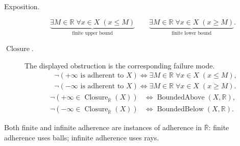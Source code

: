 \begin{remark*}
\begin{description}
  \item[Exposition.]
\[
\underbrace{\exists M\in\mathbb{R}\;\forall x\in X\;(x\le M)}_{\text{finite upper bound}}
\qquad
\underbrace{\exists M\in\mathbb{R}\;\forall x\in X\;(x\ge M)}_{\text{finite lower bound}}.
\]


  \item[\(\operatorname{Closure}.\)]
  The displayed obstruction is the corresponding failure mode.
  \[
\begin{aligned}
&\neg(+\infty\text{ is adherent to }X)
\Longleftrightarrow
\exists M\in\mathbb{R}\;\forall x\in X\;(x\le M),\\
&\neg(-\infty\text{ is adherent to }X)
\Longleftrightarrow
\exists M\in\mathbb{R}\;\forall x\in X\;(x\ge M).
\end{aligned}
  \]
  \[
\begin{aligned}
\neg\left(+\infty\in\operatorname{Closure}_{\overline{\mathbb{R}}}(X)\right)
&\Longleftrightarrow
\operatorname{BoundedAbove}(X,\mathbb{R}),\\
\neg\left(-\infty\in\operatorname{Closure}_{\overline{\mathbb{R}}}(X)\right)
&\Longleftrightarrow
\operatorname{BoundedBelow}(X,\mathbb{R}).
\end{aligned}
  \]
\end{description}
\end{remark*}

\begin{remark*}[Interpretation]
Both finite and infinite adherence are instances of adherence in
$\overline{\mathbb{R}}$: finite adherence uses balls; infinite
adherence uses rays.
\end{remark*}

